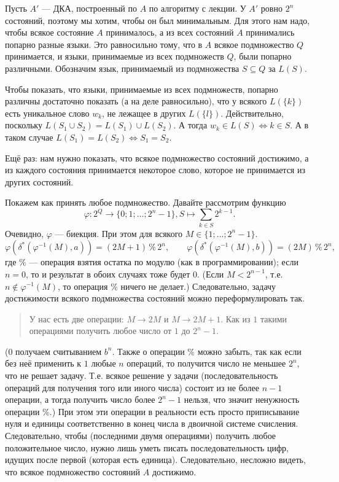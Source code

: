 \documentclass[12pt,a4paper]{article}
\begin{document}
\begin{problem}{3}
        Пусть $A'$ --- ДКА, построенный по $A$ по алгоритму с лекции. У $A'$ ровно $2^n$ состояний, поэтому мы хотим, чтобы он был минимальным. Для этого нам надо, чтобы всякое состояние $A$ принималось, а из всех состояний $A$ принимались попарно разные языки. Это равносильно тому, что в $A$ всякое подмножество $Q$ принимается, и языки, принимаемые из всех подмножеств $Q$, были попарно различными. Обозначим язык, принимаемый из подмножества $S \subseteq Q$ за $L(S)$.

        Чтобы показать, что языки, принимаемые из всех подмножеств, попарно различны достаточно показать (а на деле равносильно), что у всякого $L(\{k\})$ есть уникальное слово $w_k$, не лежащее в других $L(\{l\})$. Действительно, поскольку $L(S_1 \cup S_2) = L(S_1) \cup L(S_2)$. А тогда $w_k \in L(S) \Leftrightarrow k \in S$. А в таком случае $L(S_1) = L(S_2) \Leftrightarrow S_1 = S_2$.

        Ещё раз: нам нужно показать, что всякое подмножество состояний достижимо, а из каждого состояния принимается некоторое слово, которое не принимается из других состояний.

        Покажем как принять любое подмножество. Давайте рассмотрим функцию
        \[\varphi: 2^Q \to \{0; 1; \dots; 2^n - 1\}, S \mapsto \sum_{k \in S} 2^{k-1}.\]
        Очевидно, $\varphi$ --- биекция. При этом для всякого $M \in \{1; \dots; 2^n - 1\}$.
        \[
            \varphi(\delta^*(\varphi^{-1}(M), a)) = (2M+1) \mathbin{\%} 2^n,
            \qquad
            \varphi(\delta^*(\varphi^{-1}(M), b)) = (2M) \mathbin{\%} 2^n,
        \]
        где $\%$ --- операция взятия остатка по модулю (как в программировании); если $n = 0$, то и результат в обоих случаях тоже будет $0$. (Если $M < 2^{n-1}$, т.е. $n \notin \varphi^{-1}(M)$, то операция $\%$ ничего не делает.) Следовательно, задачу достижимости всякого подмножества состояний можно переформулировать так.
        \begin{quotation}
            У нас есть две операции: $M \to 2M$ и $M \to 2M + 1$. Как из $1$ такими операциями получить любое число от $1$ до $2^n - 1$.
        \end{quotation}
        ($0$ получаем считыванием $b^n$. Также о операции $\%$ можно забыть, так как если без неё применить к $1$ любые $n$ операций, то получится число не меньшее $2^n$, что не решает задачу. Т.е. всякое решение у задачи (последовательность операций для получения того или иного числа) состоит из не более $n-1$ операции, а тогда получить число более $2^n - 1$ нельзя, что значит ненужность операции $\%$.) При этом эти операции в реальности есть просто приписывание нуля и единицы соответственно в конец числа в двоичной системе счисления. Следовательно, чтобы (последними двумя операциями) получить любое положительное число, нужно лишь уметь писать последовательность цифр, идущих после первой (которая есть единица). Следовательно, несложно видеть, что всякое подмножество состояний $A$ достижимо.


\end{problem}
\end{document}
